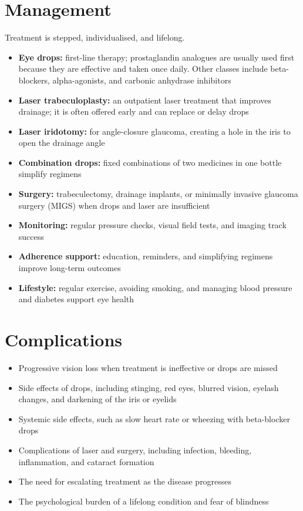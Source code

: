 \section*{Management}
Treatment is stepped, individualised, and lifelong.

\begin{itemize}
    \item \textbf{Eye drops:} first-line therapy; prostaglandin analogues are usually used first because they are effective and taken once daily. Other classes include beta-blockers, alpha-agonists, and carbonic anhydrase inhibitors
    \item \textbf{Laser trabeculoplasty:} an outpatient laser treatment that improves drainage; it is often offered early and can replace or delay drops
    \item \textbf{Laser iridotomy:} for angle-closure glaucoma, creating a hole in the iris to open the drainage angle
    \item \textbf{Combination drops:} fixed combinations of two medicines in one bottle simplify regimens
    \item \textbf{Surgery:} trabeculectomy, drainage implants, or minimally invasive glaucoma surgery (MIGS) when drops and laser are insufficient
    \item \textbf{Monitoring:} regular pressure checks, visual field tests, and imaging track success
    \item \textbf{Adherence support:} education, reminders, and simplifying regimens improve long-term outcomes
    \item \textbf{Lifestyle:} regular exercise, avoiding smoking, and managing blood pressure and diabetes support eye health
\end{itemize}

\section*{Complications}
\begin{itemize}
    \item Progressive vision loss when treatment is ineffective or drops are missed
    \item Side effects of drops, including stinging, red eyes, blurred vision, eyelash changes, and darkening of the iris or eyelids
    \item Systemic side effects, such as slow heart rate or wheezing with beta-blocker drops
    \item Complications of laser and surgery, including infection, bleeding, inflammation, and cataract formation
    \item The need for escalating treatment as the disease progresses
    \item The psychological burden of a lifelong condition and fear of blindness
\end{itemize}

